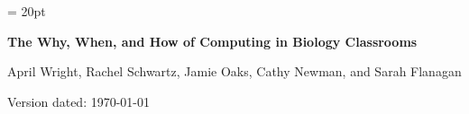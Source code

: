 \documentclass[11pt]{article}
\begin{document}
\renewcommand{\headrulewidth}{0.5pt}
\headsep = 20pt
\lhead{ }

\thispagestyle{plain}
\begin{center}

\textbf{\LARGE The Why, When, and How of Computing in Biology Classrooms}\\\vspace{2mm}

\vspace{1cm}
{\Large April Wright, Rachel Schwartz, Jamie Oaks, Cathy Newman, and Sarah Flanagan}
\vspace{1cm}
\end{center}

\def \ResourcePath {./}
\def \GlobalResourcePath {.}


Version dated: \today
\end{document}
